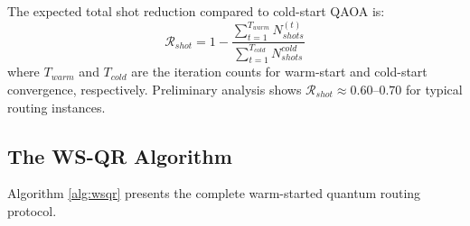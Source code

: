 \documentclass[lettersize,journal]{IEEEtran}
\begin{document}
The expected total shot reduction compared to cold-start QAOA is:
\begin{equation}
\mathcal{R}_{shot} = 1 - \frac{\sum_{t=1}^{T_{warm}} N_{shots}^{(t)}}{\sum_{t=1}^{T_{cold}} N_{shots}^{cold}}
\label{eq:shot_reduction_ratio}
\end{equation}
where $T_{warm}$ and $T_{cold}$ are the iteration counts for warm-start and cold-start convergence, respectively. Preliminary analysis shows $\mathcal{R}_{shot} \approx 0.60$--$0.70$ for typical routing instances.

\subsection{The WS-QR Algorithm}
\label{subsec:wsqr_algorithm}

Algorithm \ref{alg:wsqr} presents the complete warm-started quantum routing protocol.
\end{document}
